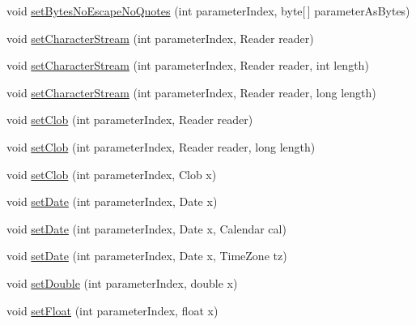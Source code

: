 \begin{DoxyCompactItemize}
\item 
void \mbox{\hyperlink{classcom_1_1mysql_1_1cj_1_1_server_prepared_query_bindings_a1de1bfdb273582492d793feb80bdb893}{set\+Bytes\+No\+Escape\+No\+Quotes}} (int parameter\+Index, byte\mbox{[}$\,$\mbox{]} parameter\+As\+Bytes)
\item 
void \mbox{\hyperlink{classcom_1_1mysql_1_1cj_1_1_server_prepared_query_bindings_adc6219857846482f9a5baefdbd8c352a}{set\+Character\+Stream}} (int parameter\+Index, Reader reader)
\item 
void \mbox{\hyperlink{classcom_1_1mysql_1_1cj_1_1_server_prepared_query_bindings_a632b1e99892136a3c50f8350a0339b67}{set\+Character\+Stream}} (int parameter\+Index, Reader reader, int length)
\item 
void \mbox{\hyperlink{classcom_1_1mysql_1_1cj_1_1_server_prepared_query_bindings_a171e8671bae919df048e8c7d23d025cf}{set\+Character\+Stream}} (int parameter\+Index, Reader reader, long length)
\item 
void \mbox{\hyperlink{classcom_1_1mysql_1_1cj_1_1_server_prepared_query_bindings_af017a913aaa0f7c3e12a9babc2ace30d}{set\+Clob}} (int parameter\+Index, Reader reader)
\item 
void \mbox{\hyperlink{classcom_1_1mysql_1_1cj_1_1_server_prepared_query_bindings_a7a2d4a739f08e642b65a9cbd5aa122ed}{set\+Clob}} (int parameter\+Index, Reader reader, long length)
\item 
void \mbox{\hyperlink{classcom_1_1mysql_1_1cj_1_1_server_prepared_query_bindings_af568e7385932d1444fa71e74dcf39f1f}{set\+Clob}} (int parameter\+Index, Clob x)
\item 
void \mbox{\hyperlink{classcom_1_1mysql_1_1cj_1_1_server_prepared_query_bindings_a7158774ba21734eeafa31e3d4ae66457}{set\+Date}} (int parameter\+Index, Date x)
\item 
void \mbox{\hyperlink{classcom_1_1mysql_1_1cj_1_1_server_prepared_query_bindings_a38a1c3be64866814f58b93d10f4685ce}{set\+Date}} (int parameter\+Index, Date x, Calendar cal)
\item 
void \mbox{\hyperlink{classcom_1_1mysql_1_1cj_1_1_server_prepared_query_bindings_a67bfe576432c4dca3e132e13178c5b54}{set\+Date}} (int parameter\+Index, Date x, Time\+Zone tz)
\item 
void \mbox{\hyperlink{classcom_1_1mysql_1_1cj_1_1_server_prepared_query_bindings_a3e91d4ab9f8e4188780d9bf16e1773ad}{set\+Double}} (int parameter\+Index, double x)
\item 
void \mbox{\hyperlink{classcom_1_1mysql_1_1cj_1_1_server_prepared_query_bindings_aeea814ec8fc7531c133a4acfcda7b013}{set\+Float}} (int parameter\+Index, float x)

\end{DoxyCompactItemize}
